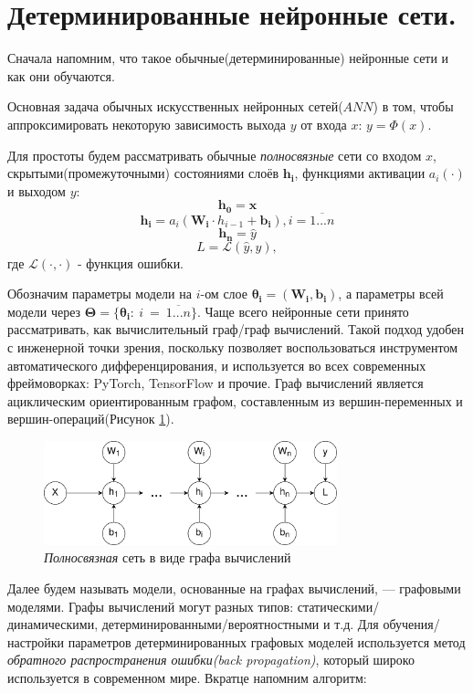 \documentclass[14pt]{article}
\begin{document}
\section{Детерминированные нейронные сети.}

Сначала напомним, что такое обычные(детерминированные) нейронные сети и как они обучаются.

Основная задача обычных искусственных нейронных сетей($ANN$) в том, чтобы аппроксимировать некоторую зависимость выхода $y$ от
 входа $x$: $y = \Phi(x)$.

Для простоты будем рассматривать обычные \textit{полносвязные} сети со входом $x$,
 скрытыми(промежуточными) состояниями слоёв $\bm{h_i}$, функциями активации $a_i(\cdot)$ и выходом $y$:
$$\bm{h_0} = \bm{x}$$
$$\bm{h_i} = a_i(\bm{W_i} \cdot h_{i-1} + \bm{b_i}), i = \overline{1...n}$$
$$\bm{h_n} = \widehat{y}$$
$$L = \mathcal{L}(\widehat{y}, y),$$ где $\mathcal{L}(\cdot, \cdot)$ - функция ошибки.

Обозначим параметры модели на $i$-ом слое $\bm{\theta_i} = (\bm{W_i}, \bm{b_i})$, а параметры всей модели через $\bm{\Theta} = \{\bm{\theta_i} :~i~=~\overline{1...n}\}$.
Чаще всего нейронные сети принято рассматривать, как вычислительный граф/граф вычислений.
 Такой подход удобен с инженерной точки зрения, поскольку позволяет воспользоваться инструментом автоматического
 дифференцирования, и используется во всех современных фреймоворках: PyTorch, TensorFlow и прочие.
 Граф вычислений является ациклическим ориентированным графом, составленным из вершин-переменных и вершин-операций(Рисунок \ref{fig:image1}).
\begin{figure}[!htbp]
    \centering
    \includegraphics[width=8.5cm]{ANN.png}
    \caption{\textit{Полносвязная} сеть в виде графа вычислений}
    \label{fig:image1}
\end{figure}

Далее будем называть модели, основанные на графах вычислений, --- графовыми моделями. Графы вычислений могут разных типов:
 статическими/динамическими, детерминированными/вероятностными и т.д. Для обучения/настройки параметров детерминированных графовых моделей
 используется метод \textit{обратного распространения ошибки(back propagation)}, который широко используется в современном мире. Вкратце напомним алгоритм:
\end{document}

